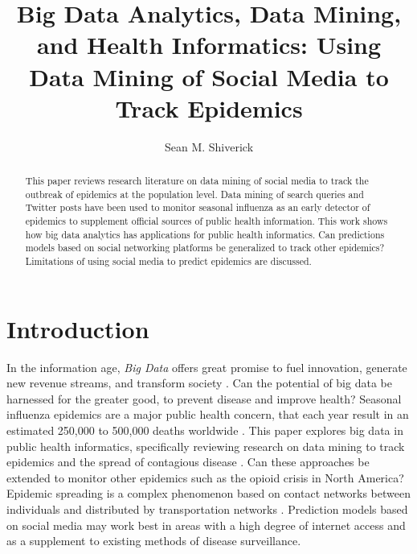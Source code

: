 \documentclass[sigconf]{acmart}
\begin{document}
\title{Big Data Analytics, Data Mining, and Health Informatics: 
Using Data Mining of Social Media to Track Epidemics}
\author{Sean M. Shiverick}


\begin{abstract}
This paper reviews research literature on data mining of social media to track 
the outbreak of epidemics at the population level. Data mining of search queries 
and Twitter posts have been used to monitor seasonal influenza as an early 
detector of epidemics to supplement official sources of public health information. 
This work shows how big data analytics has applications for public health informatics. 
Can predictions models based on social networking platforms be generalized to track 
other epidemics? Limitations of using social media to predict epidemics are discussed.
\end{abstract}


\maketitle

\section{Introduction}

In the information age, \textit{Big Data} offers great promise to fuel innovation, 
generate new revenue streams, and transform society \cite{gupta15}. Can the 
potential of big data be harnessed for the greater good, to prevent disease 
and improve health? Seasonal influenza epidemics are a major public health concern, 
that each year result in an estimated 250,000 to 500,000 deaths worldwide 
\cite{who17}. This paper explores big data in public health informatics, 
specifically reviewing research on data mining to track epidemics and the spread 
of contagious disease \cite{hay13}. Can these approaches be extended to monitor 
other epidemics such as the opioid crisis in North America? \cite{volkow14}
Epidemic spreading is a complex phenomenon based on contact networks between 
individuals and distributed by transportation networks \cite{Colizza06}. Prediction 
models based on social media may work best in areas with a high degree of internet 
access and as a supplement to existing methods of disease surveillance.  
\end{document}
